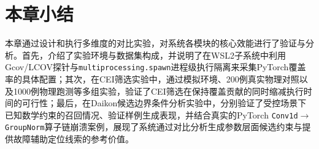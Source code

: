 \section{本章小结}

本章通过设计和执行多维度的对比实验，对系统各模块的核心效能进行了验证与分析。首先，介绍了实验环境与数据集构成，并说明了在WSL2子系统中利用Gcov/LCOV探针与\texttt{multiprocessing.spawn}进程级执行隔离来采集PyTorch覆盖率的具体配置；其次，在CEI筛选实验中，通过模拟环境、200例真实物理对照以及1000例物理跑测等多组实验，验证了CEI筛选在保持覆盖贡献的同时缩减执行时间的可行性；最后，在Daikon候选边界条件分析实验中，分别验证了受控场景下已知数学约束的召回情况、验证样例生成表现，并结合真实的PyTorch \texttt{Conv1d}$\to$\texttt{GroupNorm}算子链崩溃案例，展现了系统通过对比分析生成参数层面候选约束与提供故障辅助定位线索的参考价值。

